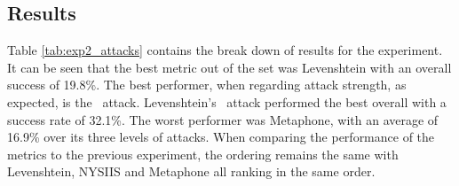 \subsection*{Results}
Table \ref{tab:exp2_attacks} contains the break down of results for the experiment. It can be seen that the best metric out of the set was Levenshtein with an overall success of 19.8\%. The best performer, when regarding attack strength, as expected, is the \XOOX~attack. Levenshtein's \XOOX~attack performed the best overall with a success rate of 32.1\%. The worst performer was Metaphone, with an average of 16.9\% over its three levels of attacks. When comparing the performance of the metrics to the previous experiment, the ordering remains the same with Levenshtein, NYSIIS and Metaphone all ranking in the same order.

\begin{table}
    \caption{Success rates for simulated attacks}
    \label{tab:exp2_attacks}
\end{table}

